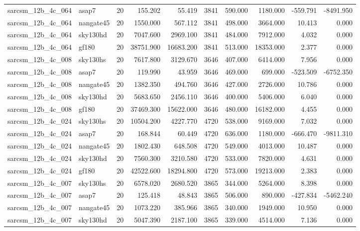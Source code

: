 \begin{tabular}{llrrrrrrrr}
sarcsm\_12b\_4c\_064 & asap7 & 20 & 155.202 & 55.419 & 3841 & 590.000 & 1180.000 & -559.791 & -8491.950 \\
sarcsm\_12b\_4c\_064 & nangate45 & 20 & 1550.000 & 567.112 & 3841 & 498.000 & 3664.000 & 10.413 & 0.000 \\
sarcsm\_12b\_4c\_064 & sky130hd & 20 & 7047.600 & 2969.100 & 3841 & 484.000 & 7912.000 & 4.032 & 0.000 \\
sarcsm\_12b\_4c\_064 & gf180 & 20 & 38751.900 & 16683.200 & 3841 & 513.000 & 18353.000 & 2.377 & 0.000 \\
sarcsm\_12b\_4c\_008 & sky130hs & 20 & 7617.800 & 3129.670 & 3646 & 407.000 & 6414.000 & 7.956 & 0.000 \\
sarcsm\_12b\_4c\_008 & asap7 & 20 & 119.990 & 43.959 & 3646 & 469.000 & 699.000 & -523.509 & -6752.350 \\
sarcsm\_12b\_4c\_008 & nangate45 & 20 & 1382.350 & 494.760 & 3646 & 427.000 & 2726.000 & 10.786 & 0.000 \\
sarcsm\_12b\_4c\_008 & sky130hd & 20 & 5683.650 & 2456.110 & 3646 & 400.000 & 5406.000 & 6.040 & 0.000 \\
sarcsm\_12b\_4c\_008 & gf180 & 20 & 37469.300 & 15622.000 & 3646 & 480.000 & 16182.000 & 4.455 & 0.000 \\
sarcsm\_12b\_4c\_024 & sky130hs & 20 & 10504.200 & 4227.770 & 4720 & 538.000 & 9169.000 & 7.032 & 0.000 \\
sarcsm\_12b\_4c\_024 & asap7 & 20 & 168.844 & 60.449 & 4720 & 636.000 & 1180.000 & -666.470 & -9811.310 \\
sarcsm\_12b\_4c\_024 & nangate45 & 20 & 1802.430 & 648.508 & 4720 & 549.000 & 4013.000 & 10.487 & 0.000 \\
sarcsm\_12b\_4c\_024 & sky130hd & 20 & 7560.300 & 3210.580 & 4720 & 533.000 & 7820.000 & 4.631 & 0.000 \\
sarcsm\_12b\_4c\_024 & gf180 & 20 & 42522.600 & 18294.800 & 4720 & 573.000 & 19213.000 & 2.383 & 0.000 \\
sarcsm\_12b\_4c\_007 & sky130hs & 20 & 6578.020 & 2680.520 & 3865 & 344.000 & 5264.000 & 8.398 & 0.000 \\
sarcsm\_12b\_4c\_007 & asap7 & 20 & 125.418 & 48.843 & 3865 & 506.000 & 890.000 & -427.834 & -5462.240 \\
sarcsm\_12b\_4c\_007 & nangate45 & 20 & 1073.220 & 385.966 & 3865 & 340.000 & 1949.000 & 10.950 & 0.000 \\
sarcsm\_12b\_4c\_007 & sky130hd & 20 & 5047.390 & 2187.100 & 3865 & 339.000 & 4514.000 & 7.136 & 0.000 \\

\end{tabular}
